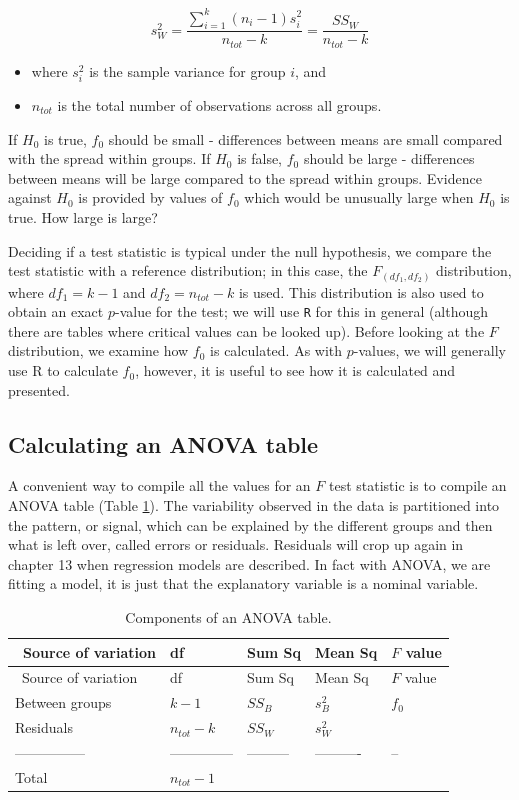\documentclass[
  oneside]{krantz}
\providecommand{\tightlist}{%
  \setlength{\itemsep}{0pt}\setlength{\parskip}{0pt}}
\begin{document}
\[s^2_W = \frac{\sum_{i=1}^{k}(n_i-1)s_i^2}{n_{tot} - k} = \frac{SS_W}{n_{tot} - k}\]

\begin{itemize}
\tightlist
\item
  where \(s_i^2\) is the sample variance for group \(i\), and
\item
  \(n_{tot}\) is the total number of observations across all groups.
\end{itemize}

If \(H_0\) is true, \(f_0\) should be small - differences between means are small compared with the spread within groups. If \(H_0\) is false, \(f_0\) should be large - differences between means will be large compared to the spread within groups. Evidence against \(H_0\) is provided by values of \(f_0\) which would be unusually large when \(H_0\) is true. How large is large?

Deciding if a test statistic is typical under the null hypothesis, we compare the test statistic with a reference distribution; in this case, the \(F_{(df_1,df_2)}\) distribution, where \(df_1=k-1\) and \(df_2=n_{tot}-k\) is used. This distribution is also used to obtain an exact \(p\)-value for the test; we will use \texttt{R} for this in general (although there are tables where critical values can be looked up). Before looking at the \(F\) distribution, we examine how \(f_0\) is calculated. As with \(p\)-values, we will generally use R to calculate \(f_0\), however, it is useful to see how it is calculated and presented.

\hypertarget{calculating-an-anova-table}{%
\subsection{Calculating an ANOVA table}\label{calculating-an-anova-table}}

A convenient way to compile all the values for an \(F\) test statistic is to compile an ANOVA table (Table \ref{tab:anovatab}). The variability observed in the data is partitioned into the pattern, or signal, which can be explained by the different groups and then what is left over, called errors or residuals. Residuals will crop up again in chapter 13 when regression models are described. In fact with ANOVA, we are fitting a model, it is just that the explanatory variable is a nominal variable.

\begin{longtable}[]{@{}lllll@{}}
\caption{\label{tab:anovatab} Components of an ANOVA table.}\tabularnewline
\toprule
~Source of variation & df & Sum Sq & Mean Sq & \(F\) value\tabularnewline
\midrule
\endfirsthead
\toprule
~Source of variation & df & Sum Sq & Mean Sq & \(F\) value\tabularnewline
\midrule
\endhead
Between groups & \(k-1\) & \(SS_B\) & \(s_B^2\) & \(f_0\)\tabularnewline
Residuals & \(n_{tot}-k\) & \(SS_W\) & \(s_W^2\) &\tabularnewline
--------------- & -------------- & --------- & ---------- & --\tabularnewline
Total & \(n_{tot}-1\) & & &\tabularnewline
\bottomrule
\end{longtable}
\end{document}
